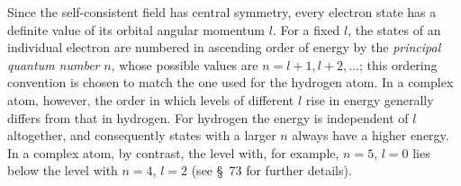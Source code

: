 Since the self-consistent field has central symmetry, every electron state
has a definite value of its orbital angular momentum $l$.  For a fixed $l$,
the states of an individual electron are numbered in ascending order of energy
by the \emph{principal quantum number} $n$, whose possible values are
$n=l+1,l+2,\ldots$; this ordering convention is chosen to match the one used
for the hydrogen atom.  In a complex atom, however, the order in which levels
of different $l$ rise in energy generally differs from that in hydrogen.  For
hydrogen the energy is independent of $l$ altogether, and consequently states
with a larger $n$ always have a higher energy.  In a complex atom, by contrast,
the level with, for example, $n=5$, $l=0$ lies below the level with $n=4$,
$l=2$ (see \S~73 for further details).
